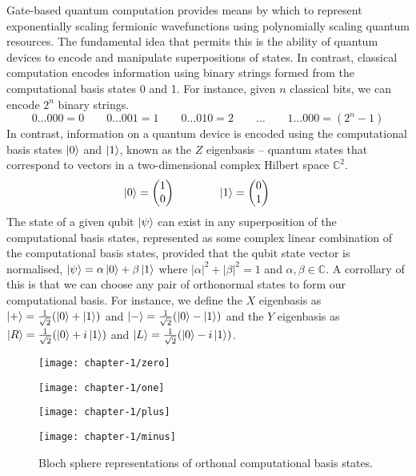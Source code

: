 Gate-based quantum computation provides means by which to represent exponentially scaling fermionic wavefunctions using polynomially scaling quantum resources. The fundamental idea that permits this is the ability of quantum devices to encode and manipulate superpositions of states. In contrast, classical computation encodes information using binary strings formed from the computational basis states 0 and 1. For instance, given $n$ classical bits, we can encode $2^n$ binary strings.
\begin{equation*}
    0 \dots 000 = 0 \qquad
    0 \dots 001 = 1 \qquad
    0 \dots 010 = 2 \qquad\dots\qquad
    1 \dots 000 = (2^n - 1)
\end{equation*}
In contrast, information on a quantum device is encoded using the computational basis states $\ket 0$ and $\ket 1$, known as the $Z$ eigenbasis -- quantum states that correspond to vectors in a two-dimensional complex Hilbert space $\mathbb{C}^2$.
\begin{equation*}
    \ket 0 = \begin{pmatrix} 1 \\ 0 \end{pmatrix} \qquad\qquad
    \ket 1 = \begin{pmatrix} 0 \\ 1 \end{pmatrix} \qquad
\end{equation*}
The state of a given qubit $\ket\psi$ can exist in any superposition of the computational basis states, represented as some complex linear combination of the computational basis states, provided that the qubit state vector is normalised, $\ket\psi = \alpha\ket 0 + \beta\ket 1$ where $|\alpha|^2 + |\beta|^2 = 1$ and $\alpha, \beta \in \mathbb{C}$. A corrollary of this is that we can choose any pair of orthonormal states to form our computational basis. For instance, we define the $X$ eigenbasis as $\ket + = \frac{1}{\sqrt 2} (\ket 0 + \ket 1)$ and $\ket - = \frac{1}{\sqrt 2} (\ket 0 - \ket 1)$ and the $Y$ eigenbasis as $\ket R = \frac{1}{\sqrt{2}} (\ket 0 + i\ket 1)$ and $\ket L = \frac{1}{\sqrt{2}} (\ket 0 - i\ket 1)$.

\begin{figure}[H]
    \centering
    \begin{minipage}{.23\textwidth}
        \centering
        \texttt{[image: chapter-1/zero]}
    \end{minipage}%
    \begin{minipage}{0.23\textwidth}
        \centering
        \texttt{[image: chapter-1/one]}
    \end{minipage}
    \begin{minipage}{0.23\textwidth}
        \centering
        \texttt{[image: chapter-1/plus]}
    \end{minipage}
    \begin{minipage}{0.23\textwidth}
        \centering
        \texttt{[image: chapter-1/minus]}
    \end{minipage}
    \caption{Bloch sphere representations of orthonal computational basis states.}
\end{figure}

